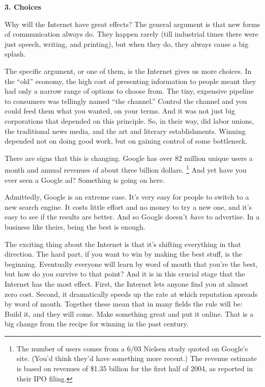 \documentclass[12pt]{book}
\begin{document}
\textbf{3. Choices}

Why will the Internet have great effects? The general argument is that
new forms of communication always do. They happen rarely (till
industrial times there were just speech, writing, and printing), but
when they do, they always cause a big splash.

The specific argument, or one of them, is the Internet gives us more
choices. In the ``old'' economy, the high cost of presenting information
to people meant they had only a narrow range of options to choose from.
The tiny, expensive pipeline to consumers was tellingly named ``the
channel.'' Control the channel and you could feed them what you wanted,
on your terms. And it was not just big corporations that depended on
this principle. So, in their way, did labor unions, the traditional news
media, and the art and literary establishments. Winning depended not on
doing good work, but on gaining control of some bottleneck.

There are signs that this is changing. Google has over 82 million unique
users a month and annual revenues of about three billion dollars.
\footnote{The number of users comes from a 6/03 Nielsen study quoted on
Google's site. (You'd think they'd have something more recent.) The
revenue estimate is based on revenues of \$1.35 billion for the first
half of 2004, as reported in their IPO filing.} And yet have you ever seen a Google ad? Something is going on
here.

Admittedly, Google is an extreme case. It's very easy for people to
switch to a new search engine. It costs little effort and no money to
try a new one, and it's easy to see if the results are better. And so
Google doesn't \emph{have} to advertise. In a business like theirs,
being the best is enough.

The exciting thing about the Internet is that it's shifting everything
in that direction. The hard part, if you want to win by making the best
stuff, is the beginning. Eventually everyone will learn by word of mouth
that you're the best, but how do you survive to that point? And it is in
this crucial stage that the Internet has the most effect. First, the
Internet lets anyone find you at almost zero cost. Second, it
dramatically speeds up the rate at which reputation spreads by word of
mouth. Together these mean that in many fields the rule will be: Build
it, and they will come. Make something great and put it online. That is
a big change from the recipe for winning in the past century.
\end{document}
